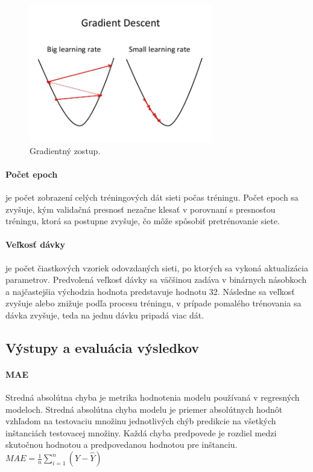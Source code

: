 \begin{figure}[!htbp]
  \centering
  \includegraphics[width=8cm]{img/learningrate.jpg}
  \caption{Gradientný zostup.}
  \label{learningrate}
\end{figure}

\paragraph{Počet epoch} je počet zobrazení celých tréningových dát sieti počas tréningu. Počet epoch sa zvyšuje, kým validačná presnosť nezačne klesať v porovnaní s presnosťou tréningu, ktorá sa postupne zvyšuje, čo môže spôsobiť pretrénovanie siete.

\paragraph{Veľkosť dávky} je počet čiastkových vzoriek odovzdaných sieti, po ktorých sa vykoná aktualizácia parametrov. Predvolená veľkosť dávky sa väčšinou zadáva v binárnych násobkoch a najčastejšia východzia hodnota predstavuje hodnotu 32. Následne sa veľkosť zvyšuje alebo znižuje podľa procesu tréningu, v prípade pomalého trénovania sa dávka zvyšuje, teda na jednu dávku pripadá viac dát.


\subsection{Výstupy a evaluácia výsledkov}
\label{evaluacia}

\paragraph{MAE} Stredná absolútna chyba je metrika hodnotenia modelu používaná v regresných modeloch. Stredná absolútna chyba modelu je priemer absolútnych hodnôt vzhľadom na testovaciu množinu jednotlivých chýb predikcie na všetkých inštanciách testovacej množiny. Každá chyba predpovede je rozdiel medzi skutočnou hodnotou a predpovedanou hodnotou pre inštanciu. \newline
$MAE = {\frac{1}{n}\sum_{i=1}^{n}(Y-\widehat{Y})}$

